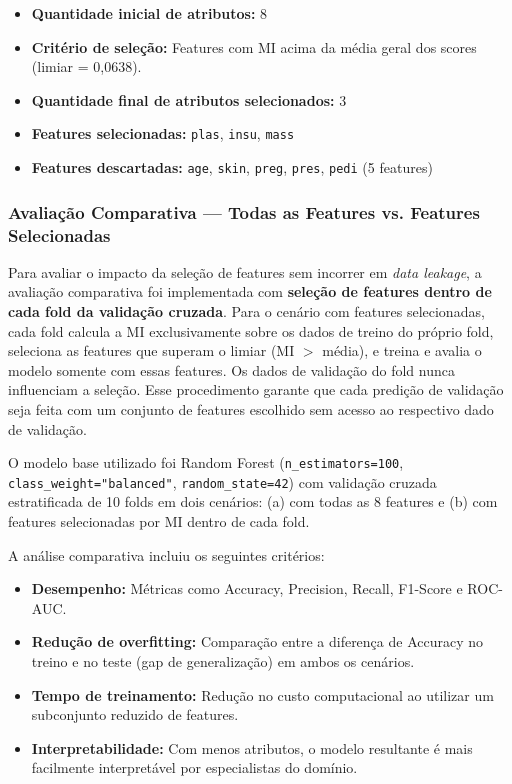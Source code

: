 \documentclass[12pt]{article}
\begin{document}
\begin{itemize}
\item \textbf{Quantidade inicial de atributos:} 8
\item \textbf{Critério de seleção:} Features com MI acima da média geral dos scores (limiar = 0,0638).
\item \textbf{Quantidade final de atributos selecionados:} 3
\item \textbf{Features selecionadas:} \texttt{plas}, \texttt{insu}, \texttt{mass}
\item \textbf{Features descartadas:} \texttt{age}, \texttt{skin}, \texttt{preg}, \texttt{pres}, \texttt{pedi} (5 features)

\end{itemize}
\subsubsection{Avaliação Comparativa --- Todas as Features vs. Features Selecionadas}

Para avaliar o impacto da seleção de features sem incorrer em \textit{data leakage}, a avaliação comparativa foi implementada com \textbf{seleção de features dentro de cada fold da validação cruzada}. Para o cenário com features selecionadas, cada fold calcula a MI exclusivamente sobre os dados de treino do próprio fold, seleciona as features que superam o limiar (MI $>$ média), e treina e avalia o modelo somente com essas features. Os dados de validação do fold nunca influenciam a seleção. Esse procedimento garante que cada predição de validação seja feita com um conjunto de features escolhido sem acesso ao respectivo dado de validação.

O modelo base utilizado foi Random Forest (\texttt{n\_estimators=100}, \texttt{class\_weight="balanced"}, \texttt{random\_state=42}) com validação cruzada estratificada de 10 folds em dois cenários: (a) com todas as 8 features e (b) com features selecionadas por MI dentro de cada fold.

A análise comparativa incluiu os seguintes critérios:

\begin{itemize}
\item \textbf{Desempenho:} Métricas como Accuracy, Precision, Recall, F1-Score e ROC-AUC.
\item \textbf{Redução de overfitting:} Comparação entre a diferença de Accuracy no treino e no teste (gap de generalização) em ambos os cenários.
\item \textbf{Tempo de treinamento:} Redução no custo computacional ao utilizar um subconjunto reduzido de features.
\item \textbf{Interpretabilidade:} Com menos atributos, o modelo resultante é mais facilmente interpretável por especialistas do domínio.

\end{itemize}
\end{document}
